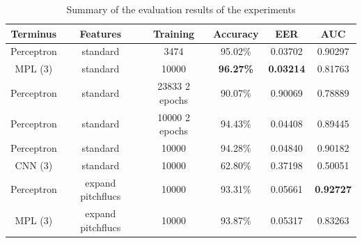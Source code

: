 \documentclass{article}
\begin{document}
\begin{table}[htbp]
			\caption{Summary of the evaluation results of the experiments}
			\vspace{10pt}
			\centering
			\footnotesize
			\begin{tabular}{|c | c | c | c | c | c|}
				\hline
				\textbf{Terminus} & \textbf{Features} & \textbf{Training} & \textbf{Accuracy} & \textbf{EER} & \textbf{AUC} \\
				\hline 
				Perceptron & standard & 3474 & 95.02\% & 0.03702 & 0.90297 \\ \hline
				MPL (3) & standard & 10000 & \textbf{96.27\%} & \textbf{0.03214} & 0.81763 \\ \hline
				Perceptron & standard & 23833 2 epochs & 90.07\% & 0.90069 & 0.78889 \\ \hline
				Perceptron & standard & 10000 2 epochs & 94.43\% & 0.04408 & 0.89445 \\ \hline
				Perceptron & standard & 10000 & 94.28\% & 0.04840 & 0.90182 \\ \hline
				CNN (3) & standard & 10000 & 62.80\% & 0.37198 & 0.50051 \\ \hline
				Perceptron & expand pitch\-flucs & 10000 & 93.31\% & 0.05661 & \textbf{0.92727} \\ \hline
				MPL (3) & expand pitch\-flucs & 10000 & 93.87\% & 0.05317 & 0.83263 \\ \hline
			\end{tabular}
			\label{table:eval-results}
		\end{table}
\end{document}
